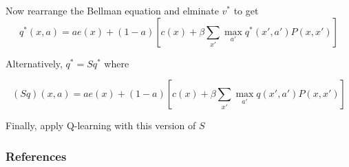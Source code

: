 \documentclass[xcolor=dvipsnames]{beamer}  %
\newcommand{\1}{\mathbbm 1}
\begin{document}
\begin{frame}
    
    Now rearrange the Bellman equation and elminate $v^*$ to get
    \begin{equation*}
        q^*(x,a) =
            a e(x) + (1-a)
            \left[ 
                c(x) + \beta \sum_{x'} \max_{a'}  q^*(x', a')P(x,x')
            \right]
    \end{equation*}

    Alternatively, $q^* = S q^*$ where

    \begin{equation*}
        (Sq)(x,a) =
            a e(x) + (1-a)
            \left[ 
                c(x) + \beta \sum_{x'} \max_{a'}  q(x', a')P(x,x')
            \right]
    \end{equation*}

    Finally, apply Q-learning with this version of $S$

\end{frame}

\begin{frame}[allowframebreaks]
    \frametitle{References}

    

    

\end{frame}
\end{document}

